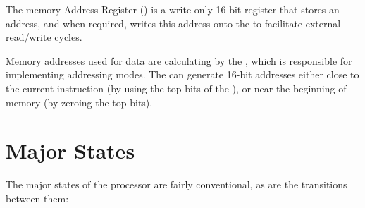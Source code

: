The memory Address Register (\AR{}) is a write-only 16-bit register that stores
an address, and when required, writes this address onto the \ABUS{} to
facilitate external read/write cycles.

Memory addresses used for data are calculating by the \AGL{}, which is
responsible for implementing addressing modes. The \AGL{} can generate 16-bit
addresses either close to the current instruction (by using the top bits of the
\PC{}), or near the beginning of memory (by zeroing the top bits).

\section{Major States}
\label{sec:major-states}

The major states of the processor are fairly conventional, as are the transitions between them:

